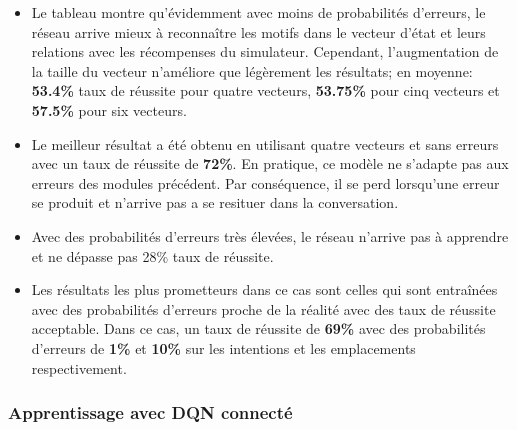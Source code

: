 \begin{itemize}
	\item Le tableau montre qu'évidemment avec moins de probabilités d'erreurs, le réseau arrive mieux à reconnaître les motifs dans le vecteur d'état et leurs relations avec les récompenses du simulateur. Cependant, l'augmentation de la taille du vecteur n'améliore que légèrement les résultats; en moyenne: \textbf{53.4\%} taux de réussite pour quatre vecteurs, \textbf{53.75\%} pour cinq vecteurs et \textbf{57.5\%} pour six vecteurs.
	\item Le meilleur résultat a été obtenu en utilisant quatre vecteurs et sans erreurs avec un taux de réussite de \textbf{72\%}. En pratique, ce modèle ne s'adapte pas aux erreurs des modules précédent. Par conséquence, il se perd lorsqu'une erreur se produit et n'arrive pas a se resituer dans la conversation.
	\item Avec des probabilités d'erreurs très élevées, le réseau n'arrive pas à apprendre et ne dépasse pas 28\% taux de réussite.
	\item Les résultats les plus prometteurs dans ce cas sont celles qui sont entraînées avec des probabilités d'erreurs proche de la réalité avec des taux de réussite acceptable. Dans ce cas, un taux de réussite de \textbf{69\%} avec des probabilités d'erreurs de \textbf{1\%} et \textbf{10\%} sur les intentions et les emplacements respectivement.
\end{itemize}

\subsubsection{Apprentissage avec DQN connecté}
